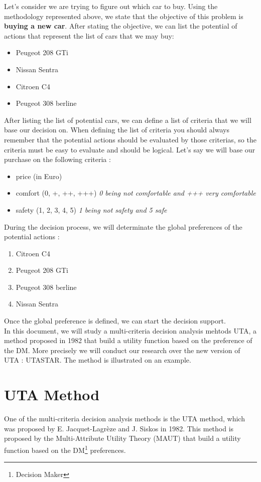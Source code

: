 \documentclass{report}
\begin{document}
Let's consider we are trying to figure out which car to buy. Using the methodology represented above, we state that the objective of this problem is \textbf{buying a new car}. After stating the objective, we can list the potential of actions that represent the list of cars that we may buy: 
\begin{itemize}
\item Peugeot 208 GTi
\item Nissan Sentra
\item Citroen C4
\item Peugeot 308 berline
\end{itemize}
After listing the list of potential cars, we can define a list of criteria that we will base our decision on. When defining the list of criteria you should always remember that the potential actions should be evaluated by those criterias, so the criteria must be easy to evaluate and should be logical. Let's say we will base our purchase on the following criteria :
\begin{itemize}
\item price (in Euro)
\item comfort (0, +, ++, +++) \textit{0 being not comfortable and +++ very comfortable}
\item safety (1, 2, 3, 4, 5) \textit{1 being not safety and 5 safe}
\end{itemize}
During the decision process, we will determinate the global preferences of the potential actions :
\begin{enumerate}
\item Citroen C4
\item Peugeot 208 GTi
\item Peugeot 308 berline
\item Nissan Sentra
\end{enumerate}
Once the global preference is defined, we can start the decision support.\\

In this document, we will study a multi-criteria decision analysis mehtods UTA, a method proposed in 1982 that build a utility function based on the preference of the DM. More precisely we will conduct our research over the new version of UTA : UTASTAR. The method is illustrated on an example.

\chapter{UTA Method}
One of the multi-criteria decision analysis methods is the UTA method, which was proposed by E. Jacquet-Lagrèze and J. Siskos in 1982. This method is proposed by the Multi-Attribute Utility Theory (MAUT) that build a utility function based on the DM\footnote{Decision Maker} preferences.\\
 
\end{document}
